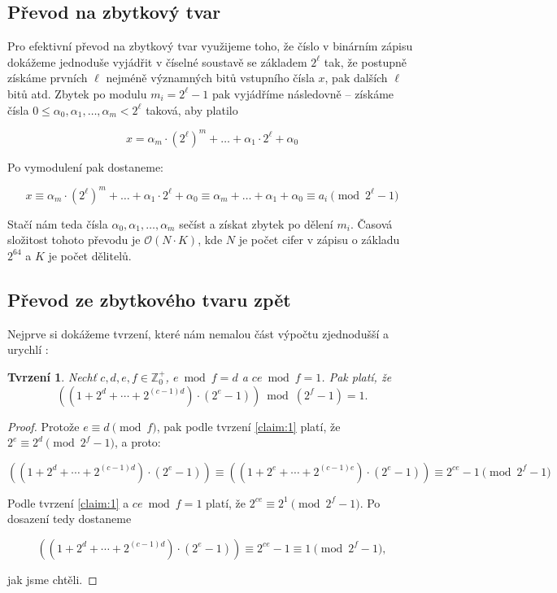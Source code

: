 \documentclass[titlepage]{article}
\newtheorem{claim}{Tvrzení}
\begin{document}
\subsection{Převod na zbytkový tvar}

Pro efektivní převod na zbytkový tvar využijeme toho, že číslo v binárním zápisu dokážeme
jednoduše vyjádřit v číselné soustavě se základem $2^{\ell}$ tak, že postupně
získáme prvních $\ell$ nejméně významných bitů vstupního čísla $x$, pak dalších
$\ell$ bitů atd. Zbytek po modulu $m_i = 2^{\ell} - 1$ pak vyjádříme následovně --
získáme čísla $0 \leq \alpha_0, \alpha_1, \dots, \alpha_m < 2^{\ell}$ taková,
aby platilo

$$
x = \alpha_m \cdot (2^{\ell})^m + \dots + \alpha_1 \cdot 2^{\ell} + \alpha_0
$$

Po vymodulení pak dostaneme:

$$
x \equiv \alpha_m \cdot (2^{\ell})^m + \dots + \alpha_1 \cdot 2^{\ell} + \alpha_0 
  \equiv \alpha_m + \dots + \alpha_1 + \alpha_0 
  \equiv a_i \pmod{2^{\ell} - 1}
$$

Stačí nám teda čísla $\alpha_0, \alpha_1, \dots, \alpha_m$ sečíst a získat
zbytek po dělení $m_i$. Časová složitost tohoto převodu je $\mathcal{O}(N \cdot
K)$, kde $N$ je počet cifer v zápisu o základu $2^{64}$ a $K$ je počet
dělitelů.

\subsection{Převod ze zbytkového tvaru zpět}

Nejprve si dokážeme tvrzení, které nám nemalou část výpočtu zjednodušší a
urychlí \cite{knuth_taocp2}:

\begin{claim}
  Nechť $c,d,e,f \in \mathbb{Z}^+_0$, $e \bmod f = d$ a $ce \bmod f = 1$. Pak platí, že
  $$
  \left((1 + 2^d + \cdots + 2^{(c-1)d}) \cdot (2^e - 1)\right) \bmod (2^f - 1) = 1.
  $$
\end{claim}
\begin{proof}
  Protože $e \equiv d \pmod{f}$, pak podle tvrzení \ref{claim:1} platí, že $2^e
  \equiv 2^d \pmod{2^f - 1}$, a proto:

  $$
  \left((1 + 2^d + \cdots + 2^{(c-1)d}) \cdot (2^e - 1)\right)  
    \equiv \left((1 + 2^e + \cdots + 2^{(c-1)e}) \cdot (2^e - 1)\right)
    \equiv 2^{ce} - 1 \pmod{2^f - 1}
  $$

  Podle tvrzení \ref{claim:1} a $ce \bmod f = 1$ platí, že $2^{ce} \equiv 2^1
  \pmod{2^f - 1}$. Po dosazení tedy dostaneme

  $$
  \left((1 + 2^d + \cdots + 2^{(c-1)d}) \cdot (2^e - 1)\right) 
    \equiv 2^{ce} - 1 \equiv 1 \pmod{2^f - 1},
  $$

  jak jsme chtěli.
\end{proof}
\end{document}
